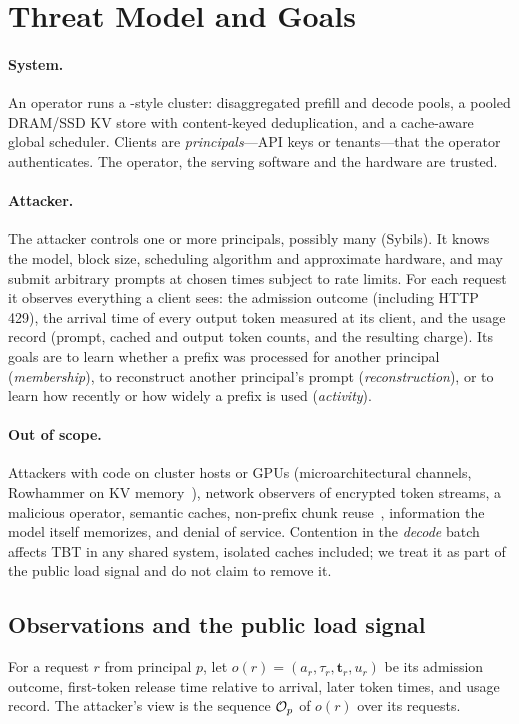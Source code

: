 \section{Threat Model and Goals}
\label{sec:threat}

\paragraph{System.} An operator runs a \mc-style cluster: disaggregated
prefill and decode pools, a pooled DRAM/SSD KV store with content-keyed
deduplication, and a cache-aware global scheduler. Clients are
\emph{principals}---API keys or tenants---that the operator authenticates. The
operator, the serving software and the hardware are trusted.

\paragraph{Attacker.} The attacker controls one or more principals, possibly
many (Sybils). It knows the model, block size, scheduling algorithm and
approximate hardware, and may submit arbitrary prompts at chosen times subject
to rate limits. For each request it observes everything a client sees: the
admission outcome (including HTTP 429), the arrival time of every output token
measured at its client, and the usage record (prompt, cached and output token
counts, and the resulting charge). Its goals are to learn whether a prefix was
processed for another principal (\emph{membership}), to reconstruct another
principal's prompt (\emph{reconstruction}), or to learn how recently or how
widely a prefix is used (\emph{activity}).

\paragraph{Out of scope.} Attackers with code on cluster hosts or GPUs
(microarchitectural channels, Rowhammer on KV memory~\cite{bitflip2026kv}),
network observers of encrypted token streams, a malicious operator,
semantic caches, non-prefix chunk reuse~\cite{yao2025cacheblend}, information
the model itself memorizes, and denial of service. Contention in the
\emph{decode} batch affects TBT in any shared system, isolated caches included;
we treat it as part of the public load signal and do not claim to remove it.

\subsection{Observations and the public load signal}
For a request $r$ from principal $p$, let
$o(r) = (a_r, \tau_r, \mathbf{t}_r, u_r)$ be its admission outcome, first-token
release time relative to arrival, later token times, and usage record. The
attacker's view is the sequence $\mathcal{O}_p$ of $o(r)$ over its requests.

